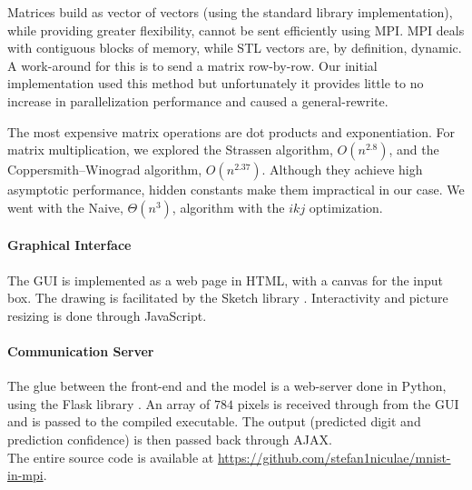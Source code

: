 \documentclass[a4paper]{article}
\begin{document}
Matrices build as vector of vectors (using the standard library implementation), while providing greater flexibility, cannot be sent efficiently using MPI. MPI deals with contiguous blocks of memory, while STL vectors are, by definition, dynamic. A work-around for this is to send a matrix row-by-row. Our initial implementation used this method but unfortunately it provides little to no increase in parallelization performance and caused a general-rewrite. 

The most expensive matrix operations are dot products and exponentiation. For matrix multiplication, we explored the Strassen algorithm, $O(n^{2.8})$, and the Coppersmith–Winograd algorithm, $O(n^{2.37})$. Although they achieve high asymptotic performance, hidden constants make them impractical in our case. We went with the Naive, $\Theta(n^3)$, algorithm with the $ikj$ optimization.

\paragraph{Graphical Interface} The GUI is implemented as a web page in HTML, with a canvas for the input box.
The drawing is facilitated by the Sketch library \cite{sketch}. Interactivity and picture resizing is done through JavaScript.

\paragraph{Communication Server} The glue between the front-end and the model is a web-server done in Python, using the Flask library \cite{flask}. An array of $784$ pixels is received through from the GUI and is passed to the compiled executable. The output (predicted digit and prediction confidence) is then passed back through AJAX.
\\

\noindent The entire source code is available at \url{https://github.com/stefan1niculae/mnist-in-mpi}.

\vspace{\fill} %

    
    
\end{document}

